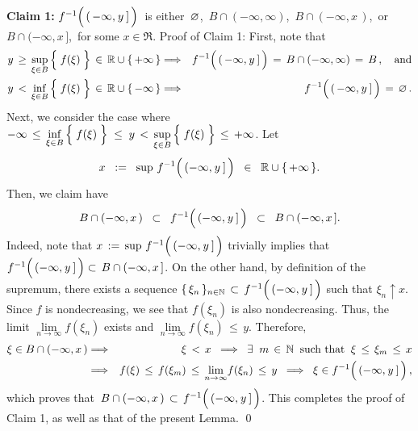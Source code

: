 \vskip 0.5cm
\noindent
\textbf{Claim 1:}\quad
$f^{-1}\!\left(\,(\,-\infty,\overset{{\color{white}-}}{y}\,]\,\right)$\,
is either \,$\varnothing$, \,$B \cap (-\infty,\infty)$, \,$B \cap (-\infty,x\,)$,\, or \,$B \cap (-\infty,x\,]$,\, for some $x\in\Re$.
\vskip 0.1cm
\noindent
Proof of Claim 1:\;\;
First, note that
\begin{eqnarray*}
y \,\geq\, \underset{\xi \in B}{\sup}\left\{\;\overset{{\color{white}.}}{f}(\xi)\;\right\} \,\in\, \Re\cup\{\,+\infty\,\}
& \Longrightarrow &
	f^{-1}\!\left(\,(\,-\infty,\overset{{\color{white}-}}{y}\,]\,\right) \,=\, B \cap (-\infty,\infty) \,=\, B\,,
	\quad
	\textnormal{and}
\\
y \,<\, \underset{\xi \in B}{\inf}\left\{\;\overset{{\color{white}.}}{f}(\xi)\;\right\} \,\in\, \Re\cup\{\,-\infty\,\}
& \Longrightarrow &
	f^{-1}\!\left(\,(\,-\infty,\overset{{\color{white}-}}{y}\,]\,\right) \,=\, \varemptyset\,.
\end{eqnarray*}
Next, we consider the case where
\;$-\infty \,\leq\, \underset{\xi \in B}{\inf}\left\{\;\overset{{\color{white}.}}{f}(\xi)\;\right\}
\;\leq\; y \,<\, \underset{\xi \in B}{\sup}\left\{\;\overset{{\color{white}.}}{f}(\xi)\;\right\} \,\leq\, +\infty$.
Let
\begin{equation*}
x \;\; := \;\; \sup\,f^{-1}\!\left(\,(-\infty,\overset{{\color{white}-}}{y}\,]\,\right) \;\; \in \;\; \Re\cup\{\,+\infty\,\}.
\end{equation*}
Then, we claim have
\begin{equation*}
B \cap (-\infty,x\,)
\;\;\subset\;\;
	f^{-1}\!\left(\,(-\infty,\overset{{\color{white}-}}{y}\,]\,\right)
\;\;\subset\;\;
	B \cap (-\infty,x\,].
\end{equation*}
Indeed, note that
$x \,:=\, \sup\,f^{-1}\!\left(\,(-\infty,\overset{{\color{white}-}}{y}\,]\,\right)$
trivially implies that
$f^{-1}\!\left(\,(-\infty,\overset{{\color{white}-}}{y}\,]\,\right) \subset\,B \cap (-\infty,x\,]$.
On the other hand, by definition of the supremum, there exists a sequence
$\{\,\xi_{n}\,\}_{n\in\N} \,\subset\, f^{-1}\!\left(\,(-\infty,\overset{{\color{white}-}}{y}\,]\,\right)$
such that $\xi_{n} \uparrow x$.
Since $f$ is nondecreasing, we see that $f(\xi_{n})$ is also nondecreasing.
Thus, the limit $\underset{n\rightarrow\infty}{\lim}f(\xi_{n})$ exists and $\underset{n\rightarrow\infty}{\lim}f(\xi_{n}) \,\leq\, y$.
Therefore,
\begin{eqnarray*}
\xi \in B \cap (-\infty,x\,)
&\Longrightarrow&
	\xi \,<\, x
\;\;\Longrightarrow\;\;
	\exists \;\; m\,\in\,\N \;\;\textnormal{such that}\;\; \xi \,\leq\, \xi_{m} \,\leq\, x
\\
&\Longrightarrow&
	f(\xi) \,\leq\, f(\xi_{m}) \,\leq\, \underset{n\rightarrow\infty}{\lim}f(\xi_{n}) \,\leq\, y
\;\;\Longrightarrow\;\;
	\xi \in f^{-1}\!\left(\,(-\infty,\overset{{\color{white}-}}{y}\,]\,\right),
\end{eqnarray*}
which proves that \,$B \cap (-\infty,x\,) \,\subset\, f^{-1}\!\left(\,(-\infty,\overset{{\color{white}-}}{y}\,]\,\right)$.
This completes the proof of Claim 1, as well as that of the present Lemma.
\qed

